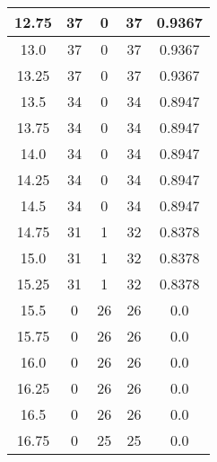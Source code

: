 \documentclass[letterpaper, 12pt]{article}
\begin{document}
\begin{longtable}{|c|c|c|c|c|}
\hline
12.75 & 37 & 0 & 37 & 0.9367 \\
\hline
13.0 & 37 & 0 & 37 & 0.9367 \\
\hline
13.25 & 37 & 0 & 37 & 0.9367 \\
\hline
13.5 & 34 & 0 & 34 & 0.8947 \\
\hline
13.75 & 34 & 0 & 34 & 0.8947 \\
\hline
14.0 & 34 & 0 & 34 & 0.8947 \\
\hline
14.25 & 34 & 0 & 34 & 0.8947 \\
\hline
14.5 & 34 & 0 & 34 & 0.8947 \\
\hline
14.75 & 31 & 1 & 32 & 0.8378 \\
\hline
15.0 & 31 & 1 & 32 & 0.8378 \\
\hline
15.25 & 31 & 1 & 32 & 0.8378 \\
\hline
15.5 & 0 & 26 & 26 & 0.0 \\
\hline
15.75 & 0 & 26 & 26 & 0.0 \\
\hline
16.0 & 0 & 26 & 26 & 0.0 \\
\hline
16.25 & 0 & 26 & 26 & 0.0 \\
\hline
16.5 & 0 & 26 & 26 & 0.0 \\
\hline
16.75 & 0 & 25 & 25 & 0.0 \\
\hline
\end{longtable}
\end{document}

